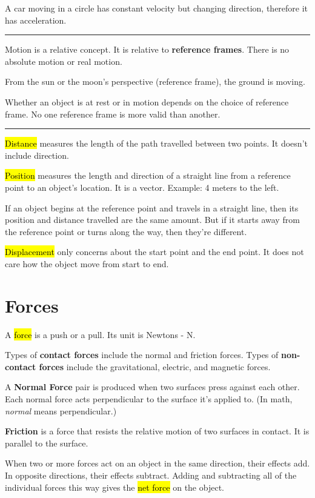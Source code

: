 A car moving in a circle has constant velocity but changing direction, therefore it has acceleration.

\noindent\rule{\textwidth}{0.4pt}

Motion is a relative concept. It is relative to \textbf{reference frames}. There is no absolute motion or real motion.

From the sun or the moon's perspective (reference frame), the ground is moving.

Whether an object is at rest or in motion depends on the choice of reference frame. No one reference frame is more valid than another.

\noindent\rule{\textwidth}{0.4pt}

\hl{Distance} measures the length of the path travelled between two points. It doesn't include direction.

\hl{Position} measures the length and direction of a straight line from a reference point to an object's location. It is a vector. Example: 4 meters to the left.

If an object begins at the reference point and travels in a straight line, then its position and distance travelled are the same amount. But if it starts away from the reference point or turns along the way, then they're different.

\hl{Displacement} only concerns about the start point and the end point. It does not care how the object move from start to end.

\section{Forces}

A \hl{force} is a push or a pull. Its unit is Newtons - N.

Types of \textbf{contact forces} include the normal and friction forces. Types of \textbf{non-contact forces} include the gravitational, electric, and magnetic forces.

A \textbf{Normal Force} pair is produced when two surfaces press against each other. Each normal force acts perpendicular to the surface it’s applied to. (In math, \textit{normal} means perpendicular.)

\textbf{Friction} is a force that resists the relative motion of two surfaces in contact. It is parallel to the surface.

\vspace{.5cm}

When two or more forces act on an object in the same direction, their effects add. In opposite directions, their effects subtract. Adding and subtracting all of the individual forces this way gives the \hl{net force} on the object.

